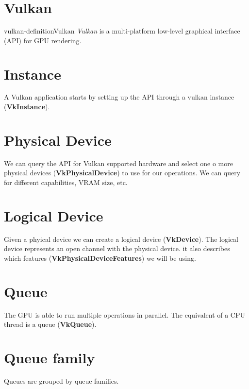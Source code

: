 \documentclass[preview]{standalone}
\begin{document}
\genpage

\section{Vulkan}

\begin{snippetdefinition}{vulkan-definition}{Vulkan}
    \textit{Vulkan} is a multi-platform low-level graphical interface (API)
    for GPU rendering.
\end{snippetdefinition}


\section{Instance}

A Vulkan application starts by setting up the API through a vulkan instance
(\textbf{VkInstance}).

\section{Physical Device}

We can query the API for Vulkan supported hardware and select
one o more physical devices (\textbf{VkPhysicalDevice}) to use for our operations.
We can query for different capabilities, VRAM size, etc.

\section{Logical Device}

Given a phyical device we can create a logical device (\textbf{VkDevice}).
The logical device represents an open channel with the physical device.
it also describes which features (\textbf{VkPhysicalDeviceFeatures}) we will be using.

\section{Queue}

The GPU is able to run multiple operations in parallel.
The equivalent of a CPU thread is a queue (\textbf{VkQueue}).

\section{Queue family}

Queues are grouped by queue families.
\end{document}
